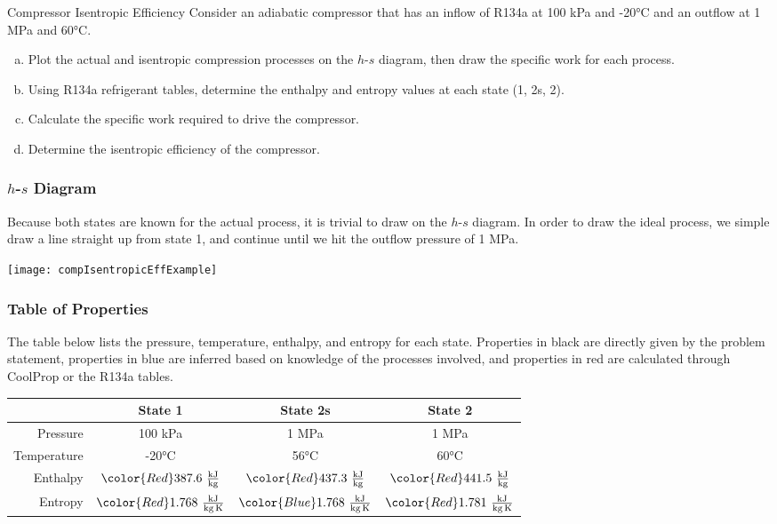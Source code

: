 \begin{example}[label=ex:isentropicEffCompressor]{Compressor Isentropic Efficiency}
  Consider an adiabatic compressor that has an inflow of R134a at 100 kPa and -20°C and an outflow at 1 MPa and 60°C.

  \begin{enumerate}[a)]
  \item Plot the actual and isentropic compression processes on the $h$-$s$ diagram, then draw the specific work for each process.
  \item Using R134a refrigerant tables, determine the enthalpy and entropy values at each state (1, 2s, 2).
  \item Calculate the specific work required to drive the compressor.
  \item Determine the isentropic efficiency of the compressor.
  \end{enumerate}
  \subsubsection*{$h$-$s$ Diagram}
  Because both states are known for the actual process, it is trivial to draw on the $h$-$s$ diagram.  In order to draw the ideal process, we simple draw a line straight up from state 1, and continue until we hit the outflow pressure of 1 MPa.

  \begin{center}
    \texttt{[image: compIsentropicEffExample]}
  \end{center}

  \subsubsection*{Table of Properties}
  The table below lists the pressure, temperature, enthalpy, and entropy for each state.  Properties in black are directly given by the problem statement, properties in blue are inferred based on knowledge of the processes involved, and properties in red are calculated through CoolProp or the R134a tables.
  \begin{table}[H]
    \centering
    \def\arraystretch{1.5}
    \begin{tabular}{r|ccc}
      & State 1 & State 2s & State 2  \\ \hline
      Pressure    & 100 kPa & {\color{Blue} 1 MPa} & 1 MPa  \\
      Temperature & -20°C   & {\color{Red} 56°C}  &   60°C   \\
      Enthalpy    & $\color{Red} 387.6\ \frac{\rm kJ}{\rm kg}$ & $\color{Red} 437.3\ \frac{\rm kJ}{\rm kg}$ & $\color{Red} 441.5\ \frac{\rm kJ}{\rm kg}$ \\
      Entropy     & $\color{Red} 1.768\ \frac{\rm kJ}{\rm kg\,K}$  & $\color{Blue} 1.768\ \frac{\rm kJ}{\rm kg\,K}$  & $\color{Red} 1.781\ \frac{\rm kJ}{\rm kg\,K}$ 
    \end{tabular}
    \def\arraystretch{1.0}
  \end{table}

\end{example}
